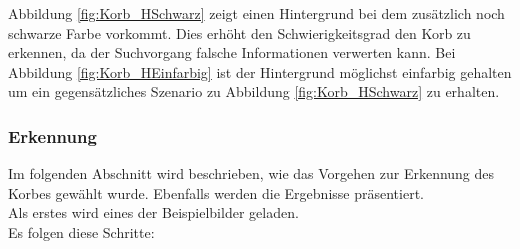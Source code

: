 \noindent Abbildung \ref{fig:Korb_HSchwarz} zeigt einen Hintergrund bei dem zusätzlich 
noch schwarze Farbe vorkommt. Dies erhöht den Schwierigkeitsgrad  den Korb zu 
erkennen, da der Suchvorgang falsche Informationen verwerten kann. Bei 
Abbildung \ref{fig:Korb_HEinfarbig} ist der Hintergrund möglichst einfarbig 
gehalten um ein gegensätzliches Szenario zu Abbildung \ref{fig:Korb_HSchwarz} 
zu erhalten.

\subsubsection{Erkennung}
Im folgenden Abschnitt wird beschrieben, wie das Vorgehen zur Erkennung des Korbes 
gewählt wurde. Ebenfalls werden die Ergebnisse präsentiert.\\
%
Als erstes wird eines der Beispielbilder geladen.\\
%
Es folgen diese Schritte:\\
%
